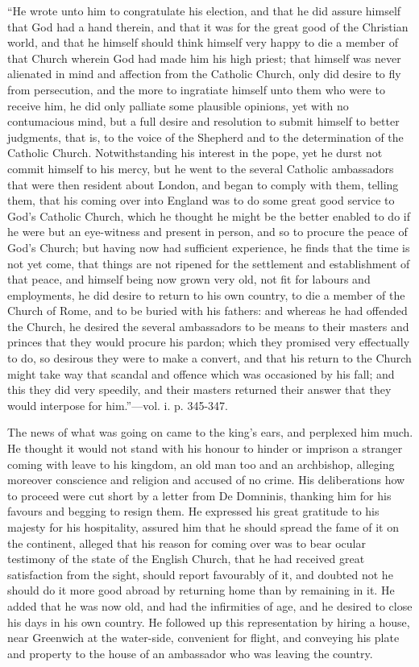 ``He wrote unto him to congratulate
his election, and that he did assure himself that God had a hand
therein, and that it was for the great good of the Christian world, and
that he himself should think himself very happy to die a member of that
Church wherein God had made him his high priest; that himself was never
alienated in mind and affection from the Catholic Church, only did
desire to fly from persecution, and the more to ingratiate himself unto
them who were to receive him, he did only palliate some plausible
opinions, yet with no contumacious mind, but a full desire and
resolution to submit himself to better judgments, that is, to the voice
of the Shepherd and to the determination of the Catholic Church.
Notwithstanding his interest in the pope, yet he durst not commit
himself to his mercy, but he went to the several Catholic ambassadors
that were then resident about London, and began to comply with them,
telling them, that his coming over into England was to do some great
good service to God's Catholic Church, which he thought he might be the
better enabled to do if he were but an eye-witness and present in
person, and so to procure the peace of God's Church; but having now had
sufficient experience, he finds that the time is not yet come, that
things are not ripened for the settlement and establishment of that
peace, and himself being now grown very old, not fit for labours and
employments, he did desire to return to his own country, to die a member
of the Church of Rome, and to be buried with his fathers: and whereas he
had offended the Church, he desired the several ambassadors to be means
to their masters and princes that they would procure his pardon; which
they promised very effectually to do, so desirous they were to make a
convert, and that his return to the Church might take way that scandal
and offence which was occasioned by his fall; and this they did very
speedily, and their masters returned their answer that they would
interpose for him.''—vol. i. p. 345-347.

The news of what was going on came to the king's
ears, and perplexed him much. He thought it would not stand with his
honour to hinder or imprison a stranger coming with leave to his
kingdom, an old man too and an archbishop, alleging moreover conscience
and religion and accused of no crime. His deliberations how to proceed
were cut short by a letter from De Domninis, thanking him for his
favours and begging to resign them. He expressed his great gratitude to
his majesty for his hospitality, assured him that he should spread the
fame of it on the continent, alleged that his reason for coming over was
to bear ocular testimony of the state of the English Church, that he had
received great satisfaction from the sight, should report favourably of
it, and doubted not he should do it more good abroad by returning home
than by remaining in it. He added that he was now old, and had the
infirmities of age, and he desired to close his days in his own country.
He followed up this representation by hiring a house, near Greenwich at
the water-side, convenient for flight, and conveying his plate and
property to the house of an ambassador who was leaving the country.

